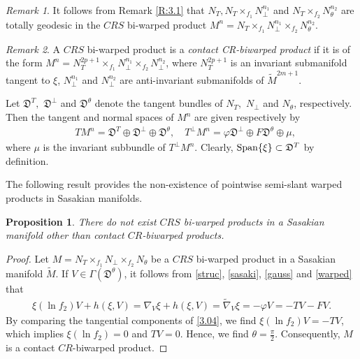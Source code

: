 \documentclass[reqno]{amsart}
\theoremstyle{plain}
\newtheorem{proposition}{Proposition}[section]
\theoremstyle{remark}
\newtheorem{remark}{Remark}[section]
\numberwithin{equation}{section}
\def\e{\eqref}
\def\e{\eqref}
\begin{document}
\begin{remark}\label{R:3.2} It follows from Remark \ref{R:3.1} that $N_{T}, N_{T}\times_{f_1}N^{n_1}_\perp$ and $N_{T}\times_{f_2}N^{n_2}_\theta$ are totally geodesic in the $CRS$ bi-warped product $M^n=N_{T}\times_{f_1}N^{n_1}_\perp\times_{f_2}N^{n_2}_\theta$.
\end{remark}

\begin{remark}\label{R:3.3} A $CRS$ bi-warped product is a {\em{contact CR-biwarped product}} if it is of the form $M^n=N_{T}^{2p+1}\times_{f_1}N^{n_1}_\perp\times_{f_2}N^{n_2}_\perp$, where $N_{T}^{2p+1}$ is an invariant submanifold tangent to $\xi$, $N^{n_1}_\perp$ and $N^{n_2}_\perp$ are anti-invariant submanifolds of $\widetilde M^{2m+1}$.
\end{remark}

Let ${\mathfrak{D}^{T}},\,\,{\mathfrak{D}}^\perp$ and ${\mathfrak{D}}^\theta$ denote the tangent bundles of $N_T,\,\,N_\perp$ and $N_\theta$, respectively. Then the tangent and normal spaces of $M^n$ are given respectively by
 \begin{align}\label{tan-nor}
 & TM^n={\mathfrak{D}^{T}}\oplus{\mathfrak{D}}^\perp\oplus{\mathfrak{D}}^\theta, \quad
T^\perp M^n=\varphi{\mathfrak{D}}^\perp\oplus F{\mathfrak{D}}^\theta\oplus\mu,
  \end{align}
where  $\mu$ is the invariant subbundle of $T^\perp M^n$. Clearly, ${\rm Span}\{\xi\}\subset {\mathfrak{D}^{T}}$ by definition.

The following result provides the non-existence of pointwise semi-slant warped products in Sasakian manifolds.

\begin{proposition}\label{P:3.1} There do not exist $CRS$ bi-warped products in a Sasakian manifold other than contact $CR$-biwarped products.
\end{proposition}
\begin{proof} Let $M=N_{T}\times_{f_1}N_\perp\times_{f_2}N_\theta$ be a $CRS$ bi-warped product in a Sasakian manifold $\widetilde M$. 
 If $V\in \Gamma({\mathfrak{D}}^\theta)$, it follows from \e{struc}, \e{sasaki}, \e{gauss} and \e{warped} that
 \begin{align}\label{3.04}\xi(\ln f_{2})V+ h(\xi,V)=\nabla_{V}\xi +h(\xi,V)=\widetilde \nabla_{V}\xi=-\varphi V=- TV -FV.\end{align}
By comparing the tangential components of \e{3.04}, we find $\xi(\ln f_{2})V=-TV$, which implies $\xi(\ln f_{2})=0$ and $TV=0$. Hence, we find $\theta=\frac{\pi}{2}$. Consequently, $M$ is a contact $CR$-biwarped product.
\end{proof}
\end{document}
